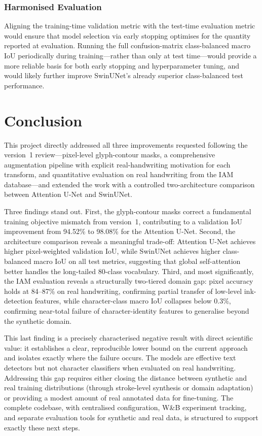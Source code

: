 \documentclass[a4paper,11pt]{article}
\begin{document}
\subsubsection{Harmonised Evaluation}

Aligning the training-time validation metric with the test-time evaluation metric would
ensure that model selection via early stopping optimises for the quantity reported at
evaluation. Running the full confusion-matrix class-balanced macro IoU periodically during
training---rather than only at test time---would provide a more reliable basis for both
early stopping and hyperparameter tuning, and would likely further improve SwinUNet's
already superior class-balanced test performance.

\section{Conclusion}
\label{sec:conclusion}

This project directly addressed all three improvements requested following the version~1
review---pixel-level glyph-contour masks, a comprehensive augmentation pipeline with
explicit real-handwriting motivation for each transform, and quantitative evaluation on
real handwriting from the IAM database---and extended the work with a controlled
two-architecture comparison between Attention U-Net and SwinUNet.

Three findings stand out. First, the glyph-contour masks correct a fundamental training
objective mismatch from version~1, contributing to a validation IoU improvement from
94.52\% to 98.08\% for the Attention U-Net. Second, the architecture comparison reveals
a meaningful trade-off: Attention U-Net achieves higher pixel-weighted validation IoU,
while SwinUNet achieves higher class-balanced macro IoU on all test metrics, suggesting
that global self-attention better handles the long-tailed 80-class vocabulary. Third, and
most significantly, the IAM evaluation reveals a structurally two-tiered domain gap:
pixel accuracy holds at 84--87\% on real handwriting, confirming partial transfer of
low-level ink-detection features, while character-class macro IoU collapses below 0.3\%,
confirming near-total failure of character-identity features to generalise beyond the
synthetic domain.

This last finding is a precisely characterised negative result with direct scientific
value: it establishes a clear, reproducible lower bound on the current approach and
isolates exactly where the failure occurs. The models are effective text detectors but not
character classifiers when evaluated on real handwriting. Addressing this gap requires
either closing the distance between synthetic and real training distributions (through
stroke-level synthesis or domain adaptation) or providing a modest amount of real
annotated data for fine-tuning. The complete codebase, with centralised configuration,
W\&B experiment tracking, and separate evaluation tools for synthetic and real data, is
structured to support exactly these next steps.
\end{document}
